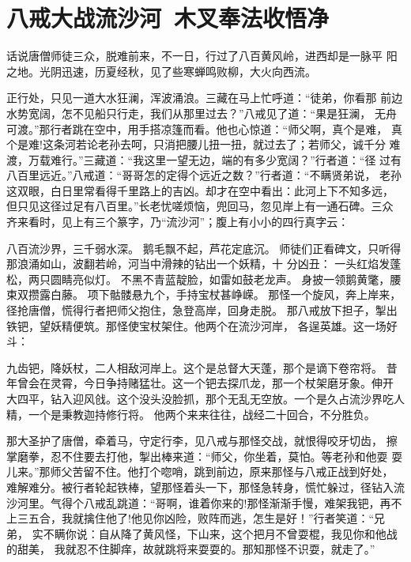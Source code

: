 \chapter{八戒大战流沙河~木叉奉法收悟净}

话说唐僧师徒三众，脱难前来，不一日，行过了八百黄风岭，进西却是一脉平
阳之地。光阴迅速，历夏经秋，见了些寒蝉鸣败柳，大火向西流。

正行处，只见一道大水狂澜，浑波涌浪。三藏在马上忙呼道：“徒弟，你看那
前边水势宽阔，怎不见船只行走，我们从那里过去？”八戒见了道：“果是狂澜，
无舟可渡。”那行者跳在空中，用手搭凉篷而看。他也心惊道：“师父啊，真个是难，
真个是难!这条河若论老孙去呵，只消把腰儿扭一扭，就过去了；若师父，诚千分
难渡，万载难行。”三藏道：“我这里一望无边，端的有多少宽阔？”行者道：“径
过有八百里远近。”八戒道：“哥哥怎的定得个远近之数？”行者道：“不瞒贤弟说，
老孙这双眼，白日里常看得千里路上的吉凶。却才在空中看出：此河上下不知多远，
但只见这径过足有八百里。”长老忧嗟烦恼，兜回马，忽见岸上有一通石碑。三众
齐来看时，见上有三个篆字，乃“流沙河”；腹上有小小的四行真字云：

八百流沙界，三千弱水深。
鹅毛飘不起，芦花定底沉。
师徒们正看碑文，只听得那浪涌如山，波翻若岭，河当中滑辣的钻出一个妖精，十
分凶丑：
一头红焰发蓬松，两只圆睛亮似灯。
不黑不青蓝靛脸，如雷如鼓老龙声。
身披一领鹅黄氅，腰束双攒露白藤。
项下骷髅悬九个，手持宝杖甚峥嵘。
那怪一个旋风，奔上岸来，径抢唐僧，慌得行者把师父抱住，急登高岸，回身走脱。
那八戒放下担子，掣出铁钯，望妖精便筑。那怪使宝杖架住。他两个在流沙河岸，
各逞英雄。这一场好斗：

九齿钯，降妖杖，二人相敌河岸上。这个是总督大天蓬，那个是谪下卷帘将。
昔年曾会在灵霄，今日争持赌猛壮。这一个钯去探爪龙，那一个杖架磨牙象。伸开
大四平，钻入迎风戗。这个没头没脸抓，那个无乱无空放。一个是久占流沙界吃人
精，一个是秉教迦持修行将。
他两个来来往往，战经二十回合，不分胜负。

那大圣护了唐僧，牵着马，守定行李，见八戒与那怪交战，就恨得咬牙切齿，
擦掌磨拳，忍不住要去打他，掣出棒来道：“师父，你坐着，莫怕。等老孙和他耍
耍儿来。”那师父苦留不住。他打个唿哨，跳到前边，原来那怪与八戒正战到好处，
难解难分。被行者轮起铁棒，望那怪着头一下，那怪急转身，慌忙躲过，径钻入流
沙河里。气得个八戒乱跳道：“哥啊，谁着你来的!那怪渐渐手慢，难架我钯，再不
上三五合，我就擒住他了!他见你凶险，败阵而逃，怎生是好！”行者笑道：“兄弟，
实不瞒你说：自从降了黄风怪，下山来，这个把月不曾耍棍，我见你和他战的甜美，
我就忍不住脚痒，故就跳将来耍耍的。那知那怪不识耍，就走了。”

